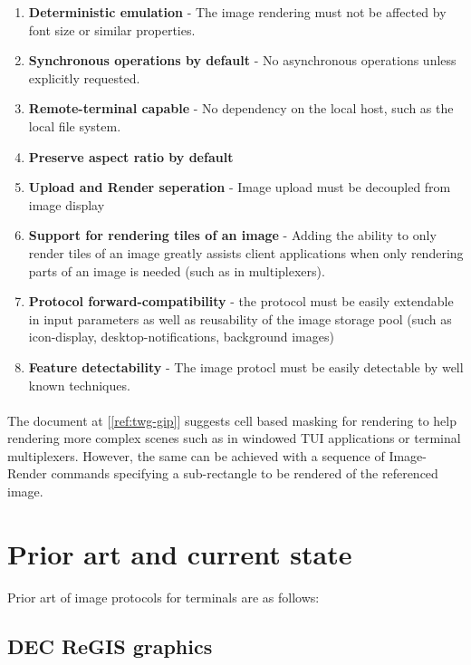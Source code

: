 \documentclass{article}
\begin{document}
\begin{enumerate}
    \item \textbf{Deterministic emulation} - The image rendering must not be affected by font size or similar properties.
    \item \textbf{Synchronous operations by default} - No asynchronous operations unless explicitly requested.
    \item \textbf{Remote-terminal capable} - No dependency on the local host, such as the local file system.
    \item \textbf{Preserve aspect ratio by default}
    \item \textbf{Upload and Render seperation} - Image upload must be decoupled from image display
    \item \textbf{Support for rendering tiles of an image} - Adding the ability to only render tiles
        of an image greatly assists client applications when only rendering parts of an image is
        needed (such as in multiplexers).
    \item \textbf{Protocol forward-compatibility} - the protocol must be easily extendable in input
        parameters as well as reusability of the image storage pool
        (such as icon-display, desktop-notifications, background images)
    \item \textbf{Feature detectability} - The image protocl must be easily detectable by well known techniques.
\end{enumerate}

\paragraph*{}

The document at [\ref{ref:twg-gip}] suggests cell based masking for rendering to help rendering more
complex scenes such as in windowed TUI applications or terminal multiplexers.
However, the same can be achieved with a sequence of Image-Render commands specifying a
sub-rectangle to be rendered of the referenced image.

\section{Prior art and current state} %

Prior art of image protocols for terminals are as follows:

\subsection{DEC ReGIS graphics}
\end{document}
